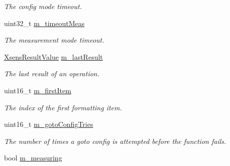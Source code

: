 \begin{DoxyCompactItemize}
\begin{DoxyCompactList}\small\item\em \-The config mode timeout. \end{DoxyCompactList}\item 
\hypertarget{classxsens_1_1Cmt3_a3c66a5f942e8dbd44830dda747193887}{uint32\-\_\-t \hyperlink{classxsens_1_1Cmt3_a3c66a5f942e8dbd44830dda747193887}{m\-\_\-timeout\-Meas}}\label{classxsens_1_1Cmt3_a3c66a5f942e8dbd44830dda747193887}

\begin{DoxyCompactList}\small\item\em \-The measurement mode timeout. \end{DoxyCompactList}\item 
\hypertarget{classxsens_1_1Cmt3_a18e26301986d0356af20ad9d11736a92}{\hyperlink{group__enums_ga822a2260a20af524029eef9e9a51ff6f}{\-Xsens\-Result\-Value} \hyperlink{classxsens_1_1Cmt3_a18e26301986d0356af20ad9d11736a92}{m\-\_\-last\-Result}}\label{classxsens_1_1Cmt3_a18e26301986d0356af20ad9d11736a92}

\begin{DoxyCompactList}\small\item\em \-The last result of an operation. \end{DoxyCompactList}\item 
\hypertarget{classxsens_1_1Cmt3_a4ec5247297dc50b6330e33566ab4f82d}{uint16\-\_\-t \hyperlink{classxsens_1_1Cmt3_a4ec5247297dc50b6330e33566ab4f82d}{m\-\_\-first\-Item}}\label{classxsens_1_1Cmt3_a4ec5247297dc50b6330e33566ab4f82d}

\begin{DoxyCompactList}\small\item\em \-The index of the first formatting item. \end{DoxyCompactList}\item 
\hypertarget{classxsens_1_1Cmt3_a234e50aa304d3367202170fc5af073ec}{uint16\-\_\-t \hyperlink{classxsens_1_1Cmt3_a234e50aa304d3367202170fc5af073ec}{m\-\_\-goto\-Config\-Tries}}\label{classxsens_1_1Cmt3_a234e50aa304d3367202170fc5af073ec}

\begin{DoxyCompactList}\small\item\em \-The number of times a goto config is attempted before the function fails. \end{DoxyCompactList}\item 
\hypertarget{classxsens_1_1Cmt3_a9277f521324a1cad9bc920c0b7cb4e05}{bool \hyperlink{classxsens_1_1Cmt3_a9277f521324a1cad9bc920c0b7cb4e05}{m\-\_\-measuring}}\label{classxsens_1_1Cmt3_a9277f521324a1cad9bc920c0b7cb4e05}


\end{DoxyCompactItemize}
